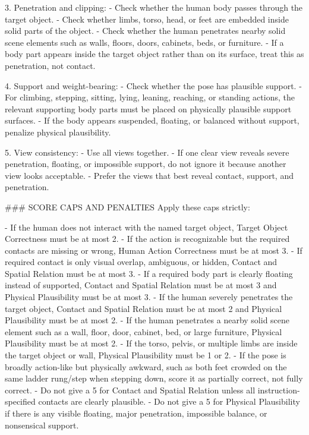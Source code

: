 \begin{promptblock}
3. Penetration and clipping:
   - Check whether the human body passes through the target object.
   - Check whether limbs, torso, head, or feet are embedded inside solid parts of the object.
   - Check whether the human penetrates nearby solid scene elements such as walls, floors, doors, cabinets, beds, or furniture.
   - If a body part appears inside the target object rather than on its surface, treat this as penetration, not contact.
 
4. Support and weight-bearing:
   - Check whether the pose has plausible support.
   - For climbing, stepping, sitting, lying, leaning, reaching, or standing actions, the relevant supporting body parts must be placed on physically plausible support surfaces.
   - If the body appears suspended, floating, or balanced without support, penalize physical plausibility.
 
5. View consistency:
   - Use all views together.
   - If one clear view reveals severe penetration, floating, or impossible support, do not ignore it because another view looks acceptable.
   - Prefer the views that best reveal contact, support, and penetration.
 
### SCORE CAPS AND PENALTIES
Apply these caps strictly:
 
- If the human does not interact with the named target object, Target Object Correctness must be at most 2.
- If the action is recognizable but the required contacts are missing or wrong, Human Action Correctness must be at most 3.
- If required contact is only visual overlap, ambiguous, or hidden, Contact and Spatial Relation must be at most 3.
- If a required body part is clearly floating instead of supported, Contact and Spatial Relation must be at most 3 and Physical Plausibility must be at most 3.
- If the human severely penetrates the target object, Contact and Spatial Relation must be at most 2 and Physical Plausibility must be at most 2.
- If the human penetrates a nearby solid scene element such as a wall, floor, door, cabinet, bed, or large furniture, Physical Plausibility must be at most 2.
- If the torso, pelvis, or multiple limbs are inside the target object or wall, Physical Plausibility must be 1 or 2.
- If the pose is broadly action-like but physically awkward, such as both feet crowded on the same ladder rung/step when stepping down, score it as partially correct, not fully correct.
- Do not give a 5 for Contact and Spatial Relation unless all instruction-specified contacts are clearly plausible.
- Do not give a 5 for Physical Plausibility if there is any visible floating, major penetration, impossible balance, or nonsensical support.
 

\end{promptblock}
